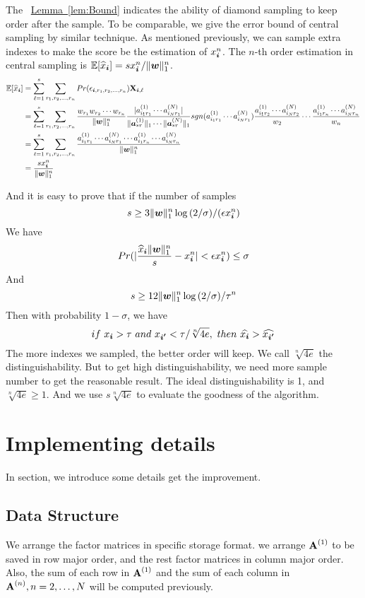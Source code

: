 \documentclass[letterpaper]{article}
\newcommand{\Sca}[3]{{#1}^{(#2)}_{i_#2#3}}%
\newcommand{\V}[1]{{\bm{{\MakeLowercase{#1}}}}}
\newcommand{\Vacol}[1]{\V{a}^{(#1)}_{*r}}
\newcommand{\M}[1]{{\bm{\mathbf{\MakeUppercase{#1}}}}}
\newcommand{\Mn}[2]{\M{#1}^{(#2)}}
\newcommand{\norm}[2]{\|#1\|_{#2}}
\newcommand{\Lem}[1] {\hyperref[lem:#1] {Lemma~\ref*{lem:#1}}} %
\begin{document}
The ~\Lem{Bound} indicates the ability of diamond sampling to keep order after the sample. To be comparable, we give the error bound of central sampling by similar technique.
As mentioned previously, we can sample extra indexes to make the score be the estimation of $x^n_{\V{i}}$. The $n$-th order estimation in central sampling is $\mathbb{E}[\widehat{x}_{\V{i}}]= sx^n_{\V{i}}/\norm{\V{w}}{1}^n$.
\begin{align*}
\mathbb{E}[\widehat{x}_{\V{i}}]& =\sum_{\ell=1}^{s}\sum_{r_1,r_2,...,r_n} Pr(\epsilon_{\V{i},r_1,r_2,...,r_n})\M{X}_{\V{i},\ell}\\
& = \sum_{\ell=1}^{s}\sum_{r_1,r_2,...,r_n}
\frac{w_{r_1}w_{r_2}\cdots w_{r_n}}{\norm{\V{W}}{1}^n}
\frac{|\Sca{a}{1}{r_1}\cdots\Sca{a}{N}{r_1}|}{\norm{\Vacol{1}}{1}\cdots\norm{\Vacol{N}}{1}}
sgn(\Sca{a}{1}{r_1}\cdots\Sca{a}{N}{r_1})\frac{\Sca{a}{1}{r_2}\cdots\Sca{a}{N}{r_2}}{w_2}\cdots\frac{\Sca{a}{1}{r_n}\cdots\Sca{a}{N}{r_n}}{w_n}
\\
& = \sum_{\ell=1}^{s}\sum_{r_1,r_2,...,r_n} \frac{\Sca{a}{1}{r_1}\cdots\Sca{a}{N}{r_1}\cdots\Sca{a}{1}{r_n}\cdots\Sca{a}{N}{r_n}}{\norm{\V{W}}{1}^n}\\
& = \frac{sx^n_{\V{i}}}{\norm{\V{w}}{1}^n}
\end{align*}

And it is easy to prove that if the number of samples
\[
s \geq 3\norm{\V{w}}{1}^n\log{(2/\sigma)}/(\epsilon x^n_{\V{i}})
\]
We have
\[
Pr(|\frac{\widehat{x}_\V{i}\norm{\V{w}}{1}^n}{s} - x^n_{\V{i}}| < \epsilon x^n_{\V{i}}) \leq \sigma
\]
And
\[
    s \geq 12\norm{\V{w}}{1}^n\log{(2/\sigma)}/\tau^n
\]
Then with probability $1-\sigma$, we have
\[
if\ x_{\V{i}} > \tau\ and \ x_{\V{i'}} < \tau/\sqrt[n]{4e}, \ then\ \widehat{x_{\V{i}}} > \widehat{x_{\V{i'}}}
\]
The more indexes we sampled, the better order will keep. We call $\sqrt[n]{4e}$ the distinguishability. But to get high distinguishability, we need more sample number to get the reasonable result. The ideal distinguishability is 1, and  $\sqrt[n]{4e} \geq 1$. And we use $s\sqrt[n]{4e}$ to evaluate the goodness of the algorithm.
\section{Implementing details}
In section, we introduce some details get the improvement.
\subsection{Data Structure}
We arrange the factor matrices in specific storage format. we arrange $\Mn{A}{1}$ to be saved in row major order, and the rest factor matrices in column major order. Also, the sum of each row in $\Mn{A}{1}$ and the sum of each column in $\Mn{A}{n},n=2,\ldots,N$ will be computed previously.
\end{document}
